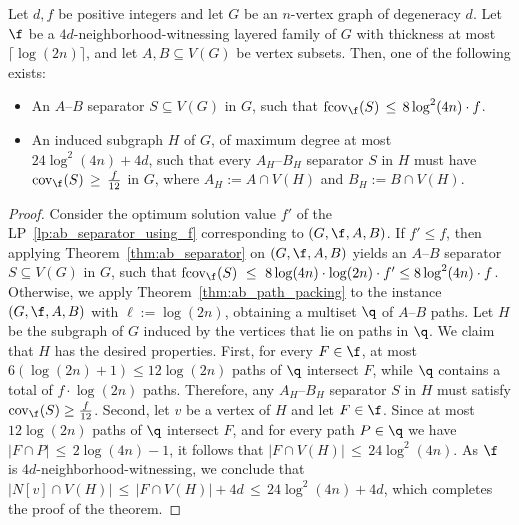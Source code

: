 \begin{theorem}\label{thm:coarse_induced_menger_aux_class}
    Let $d, f$ be positive integers and let $G$ be an $n$-vertex graph of degeneracy $d$. Let $\f$ be a $4d$-neighborhood-witnessing layered family of $G$ with thickness at most $\lceil \log (2n) \rceil$, and let $A, B \subseteq V(G)$ be vertex subsets. Then, one of the following exists:
    \begin{itemize}
        \item An $A$--$B$ separator $S\subseteq V(G)$ in $G$, such that $\mathrm{fcov}_{\f}(S)\, \leq\, 8 \log^2 (4n) \cdot f$. 
        \item An induced subgraph $H$ of $G$, of maximum degree at most $24 \log^2 (4n) + 4d$, such that every $A_H$--$B_H$ separator $S$ in $H$ must have $\mathrm{cov}_{\f}(S)\, \geq\, \frac{f}{12}$ in $G$, where $A_H := A\cap V(H)$ and $B_H := B\cap V(H)$.
    \end{itemize}
\end{theorem}
\begin{proof}
    Consider the optimum solution value $f'$ of the LP~\ref{lp:ab_separator_using_f} corresponding to $(G,\f,A,B)$. If $f' \leq f$, then applying Theorem~\ref{thm:ab_separator} on $(G,\f,A,B)$ yields an $A$--$B$ separator $S\subseteq V(G)$ in $G$, such that $\mathrm{fcov}_{\f}(S)\ \leq\ 8\log (4n) \cdot \log(2n) \cdot f' \leq 8 \log^2 (4n) \cdot f$. Otherwise, we apply Theorem~\ref{thm:ab_path_packing} to the instance $(G,\f,A,B)$ with $\ell := \log(2n)$, obtaining a multiset $\q$ of $A$--$B$ paths. 
    Let $H$ be the subgraph of $G$ induced by the vertices that lie on paths in $\q$. We claim that $H$ has the desired properties. First, for every $F \in \f$, at most $6 (\log(2n) + 1) \leq 12\log(2n)$ paths of $\q$ intersect $F$, while $\q$ contains a total of $f \cdot \log(2n)$ paths. Therefore, any $A_H$--$B_H$ separator $S$ in $H$ must satisfy $\mathrm{cov}_{\f}(S) \geq \frac{f}{12}$. Second, let $v$ be a vertex of $H$ and let $F \in \f$. Since at most $12 \log(2n)$ paths of $\q$ intersect $F$, and for every path $P \in \q$ we have $|F \cap P|\, \leq\, 2\log (4n) - 1$, it follows that $|F \cap V(H)|\, \leq\, 24 \log^2 (4n)$. As $\f$ is $4d$-neighborhood-witnessing, we conclude that $|N[v] \cap V(H)|\, \leq\, |F \cap V(H)| + 4d\, \leq\, 24 \log^2 (4n) + 4d$, which completes the proof of the theorem.
\end{proof}


